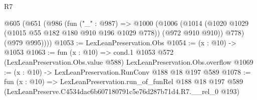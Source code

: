 \begin{lexlean}{R7}
\begin{coremodule}
  @605
    (@651
      (@986
        (fun ("_" : @987) =>
        @1000
          (@1006
            (@1014 (@1020 @1029 (@1015 @55 @182 @180 @910 @196 @1029 @778)) (@972 @910 @910))
            @778)
          (@979 @995))))
@1053 := LexLeanPreservation.Obs
@1054 := (x : @10) -> @1053
@1063 := fun (x : @10) =>
  cond.{1} @1053 @572 (LexLeanPreservation.Obs.value @588) LexLeanPreservation.Obs.overflow
@1069 := (x : @10) -> LexLeanPreservation.RunConv @188 @18 @197 @589
@1078 := fun (x : @10) =>
  LexLeanPreservation.run_of_funRel
    @188
    @18
    @197
    @589
    (LexLeanPreserve.C4534dac6b607180791c5e76d287b71d4.R7.__rel_0 @193)
\end{coremodule}
\end{lexlean}
